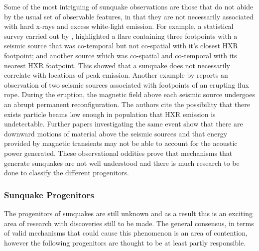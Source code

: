 Some of the most intriguing of sunquake observations are those that do not abide by the usual set of observable features, in that they are not necessarily associated with hard x-rays and excess white-light emission. For example, a statistical survey carried out by \cite{2012SoPh..277..317P}, highlighted a flare containing three footpoints with a seismic source that was co-temporal but not co-spatial with it's closest HXR footpoint; and another source which was co-spatial and co-temporal with its nearest HXR footpoint. This showed that a sunquake does not necessarily correlate with locations of peak emission. Another example by \cite{2011ApJ...741L..35Z} reports an observation of two seismic sources associated with footpoints of an erupting flux rope. During the eruption, the magnetic field above each seismic source undergoes an abrupt permanent reconfiguration. The authors cite the possibility that there exists particle beams low enough in population that HXR emission is undetectable. Further papers investigating the same event \citep{2013SoPh..284..315Z} show that there are downward motions of material above the seismic sources and that energy provided by magnetic transients may not be able to account for the acoustic power generated. These observational oddities prove that mechanisms that generate sunquakes are not well understood and there is much research to be done to classify the different progenitors.

\subsubsection{Sunquake Progenitors}\label{sunprog}


The progenitors of sunquakes are still unknown and as a result this is an exciting area of research with discoveries still to be made. The general consensus, in terms of valid mechanisms that could cause this phenomenon is an area of contention, however the following progenitors are thought to be at least partly responsible. \\

